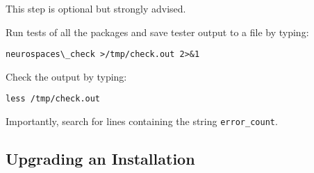 \documentclass[12pt]{article}
\begin{document}
This step is optional but strongly advised.

\begin{description}
   \item Run tests of all the packages and save tester output to a file  by typing:
   \begin{verbatim}
neurospaces\_check >/tmp/check.out 2>&1
   \end{verbatim}
   \item Check the output by typing:
   \begin{verbatim}
less /tmp/check.out
   \end{verbatim}
   \item Importantly, search for lines containing the string {\tt error\_count}.
\end{description}
    







\subsection*{Upgrading an Installation}
\end{document}
